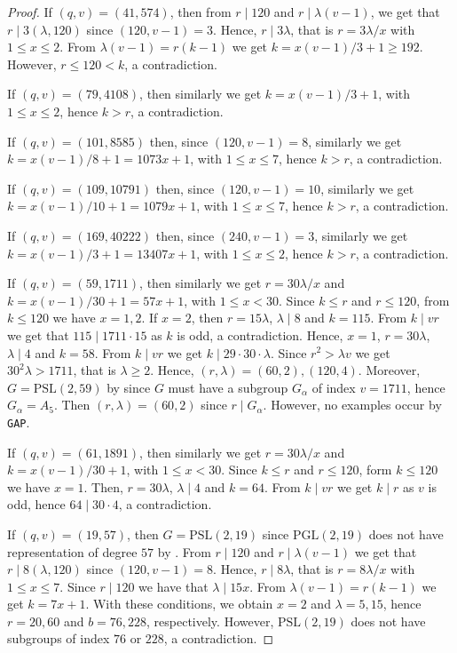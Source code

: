 \documentclass[a4paper,twopage,reqno,12pt]{amsart}
\theoremstyle{definition}
\numberwithin{equation}{section}
\newcommand{\PSL}{\mathrm{PSL}}
\newcommand{\PGL}{\mathrm{PGL}}
\newcommand{\A}{\mathrm{A}}
\newcommand{\D}{\mathrm{D}}
\begin{document}
\begin{proof}
If $(q,v)=(41,574)$, then from $r\mid 120$ and $r\mid \lambda(v-1)$, we get that $r\mid 3(\lambda,120)$ since $(120,v-1)=3$. Hence, $r\mid 3\lambda$, that is $r=3\lambda/x$ with $1\le x\le 2$. From $\lambda(v-1)=r(k-1)$ we get $k=x(v-1)/3+1\ge192$. However, $r \le 120 < k$, a contradiction.

If $(q,v)=(79, 4108)$, then similarly we get $k=x(v-1)/3+1$, with $1\le x \le 2$, hence $k> r$, a contradiction.

If $(q,v)=(101, 8585)$ then, since $(120,v-1)=8$, similarly we get $k=x(v-1)/8+1=1073x+1$, with $1\le x \le 7$, hence $k>r$, a contradiction.

If $(q,v)=(109, 10791)$ then, since $(120,v-1)=10$, similarly we get $k=x(v-1)/10+1=1079x+1$, with $1\le x \le 7$, hence $k> r$, a contradiction.

If $(q,v)=(169, 40222)$ then, since $(240,v-1)=3$, similarly we get $k=x(v-1)/3+1=13407x+1$, with $1\le x \le 2$, hence $k> r$, a contradiction.


If $(q,v)=(59, 1711)$, then similarly we get $r=30\lambda/x$ and $k=x(v-1)/30+1=57x+1$, with $1\le x< 30$. Since $k \le r$ and $r\le 120$, from $k\le 120$ we have $x=1,2$. If $x=2$, then $r=15\lambda$, $\lambda\mid8$ and $k=115$. From $k\mid vr$ we get that $115\mid1711\cdot 15$ as $k$ is odd, a contradiction. Hence, $x=1$, $r=30\lambda$, $\lambda\mid4$ and $k=58$. From $k\mid vr$ we get $k\mid 29\cdot 30\cdot\lambda$. Since $r^2>\lambda v$ we get $30^2\lambda> 1711$, that is $\lambda \ge 2$. Hence, $(r,\lambda)=(60,2),(120,4)$. Moreover, $G=\PSL(2,59)$ by \cite[§259]{Di} since $G$ must have a subgroup  $G_\alpha$ of index $v=1711$, hence $G_\alpha=A_{5}$. Then $(r,\lambda)=(60,2)$ since $r \mid G_{\alpha}$. However, no examples occur by \texttt{GAP}.

If $(q,v)=(61, 1891)$, then similarly we get $r=30\lambda/x$ and $k=x(v-1)/30+1$, with $1\le x< 30$. Since $k \le r$ and $r\le 120$, form $k\le 120$ we have $x=1$. Then, $r=30\lambda$, $\lambda\mid 4$ and $k=64$. From $k\mid vr$ we get $k\mid r$ as $v$ is odd, hence $64\mid 30\cdot 4$, a contradiction.


If $(q,v)=(19,57)$, then $G=\PSL(2,19)$ since $\PGL(2,19)$ does not have representation of degree $57$ by \cite[§259]{Di}. From $r\mid 120$ and $r\mid \lambda(v-1)$ we get that $r\mid 8(\lambda,120)$ since $(120,v-1)=8$. Hence, $r\mid 8\lambda$, that is $r=8\lambda/x$ with $1\le x \le 7$. Since $r\mid120$ we have that $\lambda\mid15x$. From $\lambda(v-1)=r(k-1)$ we get $k=7x+1$. With these conditions, we obtain $x=2$ and $\lambda=5,15$, hence $r=20,60$ and $b=76,228$, respectively. However, $\PSL(2,19)$ does not have subgroups of index $76$ or $228$, a contradiction.


\end{proof}
\end{document}
